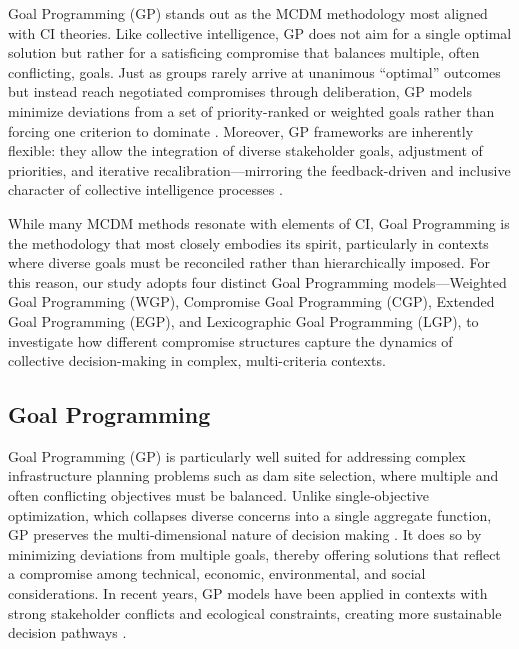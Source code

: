 Goal Programming (GP) stands out as the MCDM methodology most aligned with CI theories. Like collective intelligence, GP does not aim for a single optimal solution but rather for a satisficing compromise that balances multiple, often conflicting, goals. Just as groups rarely arrive at unanimous “optimal” outcomes but instead reach negotiated compromises through deliberation, GP models minimize deviations from a set of priority-ranked or weighted goals rather than forcing one criterion to dominate \cite{jones2010}. Moreover, GP frameworks are inherently flexible: they allow the integration of diverse stakeholder goals, adjustment of priorities, and iterative recalibration—mirroring the feedback-driven and inclusive character of collective intelligence processes \cite{Borges2020}.

While many MCDM methods resonate with elements of CI, Goal Programming is the methodology that most closely embodies its spirit, particularly in contexts where diverse goals must be reconciled rather than hierarchically imposed. For this reason, our study adopts four distinct Goal Programming models—Weighted Goal Programming (WGP), Compromise Goal Programming (CGP), Extended Goal Programming (EGP), and Lexicographic Goal Programming (LGP), to investigate how different compromise structures capture the dynamics of collective decision-making in complex, multi-criteria contexts.

\subsection{Goal Programming}
Goal Programming (GP) is particularly well suited for addressing complex infrastructure planning problems such as dam site selection, where multiple and often conflicting objectives must be balanced. Unlike single‑objective optimization, which collapses diverse concerns into a single aggregate function, GP preserves the multi‑dimensional nature of decision making \cite{CHANG2007}. It does so by minimizing deviations from multiple goals, thereby offering solutions that reflect a compromise among technical, economic, environmental, and social considerations. In recent years, GP models have been applied in contexts with strong stakeholder conflicts and ecological constraints, creating more sustainable decision pathways \cite{Castro2021}.

